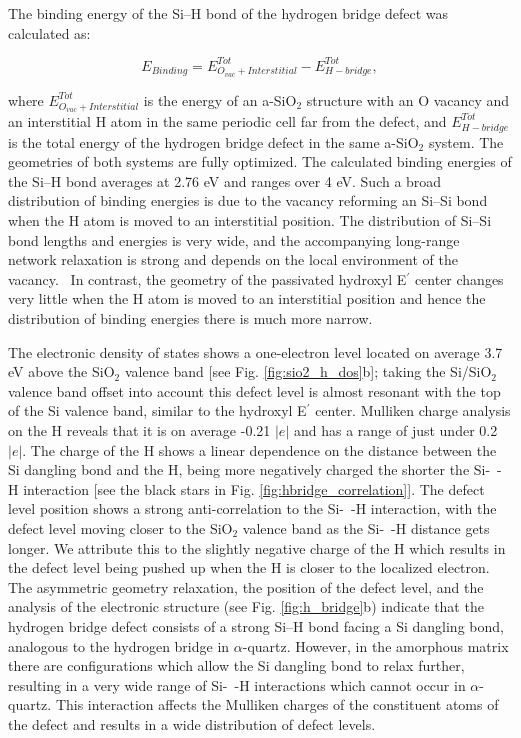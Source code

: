 \documentclass[aps,prb,reprint,superscriptaddress,showpacs]{revtex4-1}
\begin{document}
The binding energy of the \mbox{Si--H} bond of the hydrogen bridge defect was calculated as:

\begin{equation}
E_{Binding}=E^{Tot}_{O_{vac} + Interstitial}-E^{Tot}_{H-bridge},
\end{equation}

where $E^{Tot}_{O_{vac} + Interstitial}$ is the energy of an a-SiO$_2$ structure with an O vacancy and an interstitial H atom in the same periodic cell far from the defect, and $E^{Tot}_{H-bridge}$ is the total energy of the hydrogen bridge defect in the same a-SiO$_2$ system. The geometries of both systems are fully optimized. The calculated binding energies of the \mbox{Si--H} bond averages at 2.76 eV and ranges over 4 eV. Such a broad distribution of binding energies is due to the vacancy reforming an \mbox{Si--Si} bond when the H atom is moved to an interstitial position. The distribution of \mbox{Si--Si} bond lengths and energies is very wide, and the accompanying long-range network relaxation is strong and depends on the local environment of the vacancy.~\cite{asio2_3} In contrast, the geometry of the passivated hydroxyl E$^\prime$ center changes very little when the H atom is moved to an interstitial position and hence the distribution of binding energies there is much more narrow.

The electronic density of states shows a one-electron level located on average 3.7 eV above the SiO$_2$ valence band [see Fig. \ref{fig:sio2_h_dos}b]; taking the Si/SiO$_2$ valence band offset into account this defect level is almost resonant with the top of the Si valence band, similar to the hydroxyl E$^\prime$ center. Mulliken charge analysis on the H reveals that it is on average -0.21 $|e|$ and has a range of just under 0.2 $|e|$. The charge of the H shows a linear dependence on the distance between the Si dangling bond and the H, being more negatively charged the shorter the \mbox{Si- -H} interaction [see the black stars in Fig. \ref{fig:hbridge_correlation}]. The defect level position shows a strong anti-correlation to the \mbox{Si- -H} interaction, with the defect level moving closer to the SiO$_2$ valence band as the \mbox{Si- -H} distance gets longer. We attribute this to the slightly negative charge of the H which results in the defect level being pushed up when the H is closer to the localized electron. The asymmetric geometry relaxation, the position of the defect level, and the analysis of the electronic structure (see Fig. \ref{fig:h_bridge}b) indicate that the hydrogen bridge defect consists of a strong \mbox{Si--H} bond facing a Si dangling bond, analogous to the hydrogen bridge in $\alpha$-quartz. However, in the amorphous matrix there are configurations which allow the Si dangling bond to relax further, resulting in a very wide range of \mbox{Si- -H} interactions which cannot occur in $\alpha$-quartz. This interaction affects the Mulliken charges of the constituent atoms of the defect and results in a wide distribution of defect levels.
\end{document}
